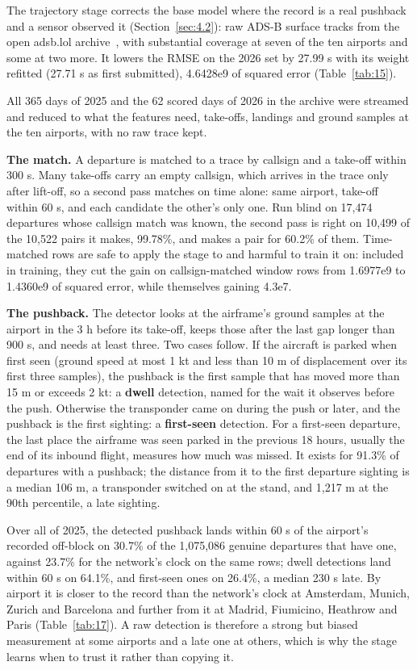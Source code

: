 \documentclass[
  manuscript=article,
  layout=preprint,
  year=2026,
  volume=x,
]{extra/joas}
\begin{document}
The trajectory stage corrects the base model where the record is a real pushback and a sensor observed it (Section~\ref{sec:4.2}): raw ADS-B surface tracks from the open adsb.lol archive~\cite{adsblol}, with substantial coverage at seven of the ten airports and some at two more. It lowers the RMSE on the 2026 set by 27.99 s with its weight refitted (27.71 s as first submitted), 4.6428e9 of squared error (Table~\ref{tab:15}).

All 365 days of 2025 and the 62 scored days of 2026 in the archive were streamed and reduced to what the features need, take-offs, landings and ground samples at the ten airports, with no raw trace kept.

\textbf{The match.} A departure is matched to a trace by callsign and a take-off within 300 s. Many take-offs carry an empty callsign, which arrives in the trace only after lift-off, so a second pass matches on time alone: same airport, take-off within 60 s, and each candidate the other's only one. Run blind on 17,474 departures whose callsign match was known, the second pass is right on 10,499 of the 10,522 pairs it makes, 99.78\%, and makes a pair for 60.2\% of them. Time-matched rows are safe to apply the stage to and harmful to train it on: included in training, they cut the gain on callsign-matched window rows from 1.6977e9 to 1.4360e9 of squared error, while themselves gaining 4.3e7.

\textbf{The pushback.} The detector looks at the airframe's ground samples at the airport in the 3 h before its take-off, keeps those after the last gap longer than 900 s, and needs at least three. Two cases follow. If the aircraft is parked when first seen (ground speed at most 1 kt and less than 10 m of displacement over its first three samples), the pushback is the first sample that has moved more than 15 m or exceeds 2 kt: a \textbf{dwell} detection, named for the wait it observes before the push. Otherwise the transponder came on during the push or later, and the pushback is the first sighting: a \textbf{first-seen} detection. For a first-seen departure, the last place the airframe was seen parked in the previous 18 hours, usually the end of its inbound flight, measures how much was missed. It exists for 91.3\% of departures with a pushback; the distance from it to the first departure sighting is a median 106 m, a transponder switched on at the stand, and 1,217 m at the 90th percentile, a late sighting.

Over all of 2025, the detected pushback lands within 60 s of the airport's recorded off-block on 30.7\% of the 1,075,086 genuine departures that have one, against 23.7\% for the network's clock on the same rows; dwell detections land within 60 s on 64.1\%, and first-seen ones on 26.4\%, a median 230 s late. By airport it is closer to the record than the network's clock at Amsterdam, Munich, Zurich and Barcelona and further from it at Madrid, Fiumicino, Heathrow and Paris (Table~\ref{tab:17}). A raw detection is therefore a strong but biased measurement at some airports and a late one at others, which is why the stage learns when to trust it rather than copying it.
\end{document}
